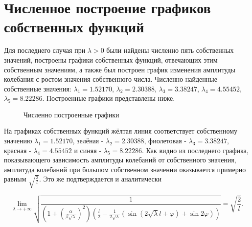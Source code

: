 \documentclass[12pt, a4paper]{report}
\begin{document}
\section{Численное построение графиков собственных функций}
Для последнего случая при $\lambda > 0$ были найдены численно пять собственных значений, построены графики собственных функций, отвечающих этим собственным значениям, а также был построен график изменения амплитуды колебания с ростом значения собственного числа.
\newline
Численно найденные собственные значения: $\lambda_{1} = 1.52170$, $\lambda_{2} = 2.30388$, $\lambda_{3} = 3.38247$, $\lambda_{4} = 4.55452$, $\lambda_{5} = 8.22286$.
\newline
Построенные графики представлены ниже.

\begin{figure}[H]
	\caption{Численно построенные графики}
\end{figure}

На графиках собственных функций жёлтая линия соответствует собственному значению $\lambda_{1} = 1.52170$, зелёная - 
$\lambda_{2} = 2.30388$, фиолетовая - $\lambda_{3} = 3.38247$, красная -  $\lambda_{4} = 4.55452$ и синяя - $\lambda_{5} = 8.22286$.
Как видно из последнего графика, показывающего зависимость амплитуды колебаний от собственного значения, амплитуда колебаний при большом собственном значении оказывается примерно равным $\sqrt{\frac{2}{l}}$. Это же подтверждается и аналитически

\[ \lim\limits_{\lambda \to +\infty} \sqrt{\frac{1}{(1 + (\frac{\alpha}{\beta \sqrt{\lambda}})^2) (\frac{l}{2} - \frac{1}{2\sqrt{\lambda}} (\sin (2\sqrt{\lambda}l + \varphi) + \sin 2\varphi))}} =  \sqrt{\frac{2}{l}}. \]
\end{document}
